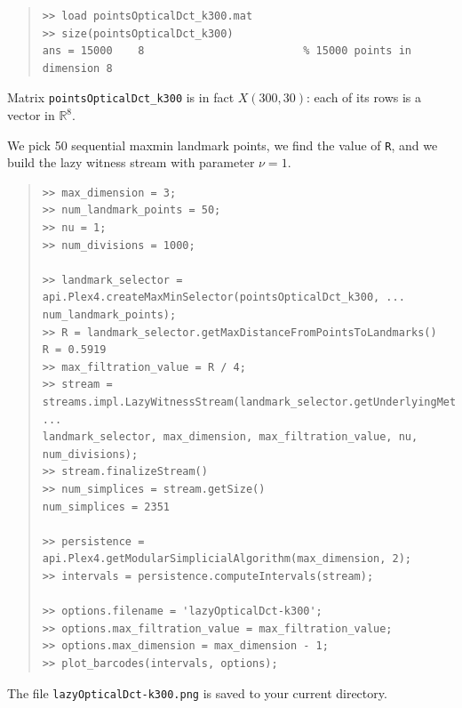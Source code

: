 \documentclass[amscd, amssymb, verbatim]{amsart}[12pt]
\theoremstyle{remark}
\theoremstyle{remark}
\theoremstyle{remark}
\newcommand{\R}{\mathbb{R}}
\begin{document}
\begin{quote} \begin{verbatim}
>> load pointsOpticalDct_k300.mat
>> size(pointsOpticalDct_k300) 
ans = 15000    8                         % 15000 points in dimension 8
\end{verbatim} \end{quote}

Matrix \texttt{pointsOpticalDct\_k300} is in fact $X(300,30)$: each of its rows is a vector in $\R^8$.

We pick 50 sequential maxmin landmark points, we find the value of \texttt{R}, and we build the lazy witness stream with parameter $\nu = 1$. 

\begin{quote} \begin{verbatim}
>> max_dimension = 3;
>> num_landmark_points = 50;
>> nu = 1;
>> num_divisions = 1000;

>> landmark_selector = api.Plex4.createMaxMinSelector(pointsOpticalDct_k300, ...
num_landmark_points);
>> R = landmark_selector.getMaxDistanceFromPointsToLandmarks() 
R = 0.5919                         
>> max_filtration_value = R / 4;
>> stream = streams.impl.LazyWitnessStream(landmark_selector.getUnderlyingMetricSpace(), ...
landmark_selector, max_dimension, max_filtration_value, nu, num_divisions);
>> stream.finalizeStream()
>> num_simplices = stream.getSize()
num_simplices = 2351                         

>> persistence = api.Plex4.getModularSimplicialAlgorithm(max_dimension, 2);
>> intervals = persistence.computeIntervals(stream);

>> options.filename = 'lazyOpticalDct-k300';
>> options.max_filtration_value = max_filtration_value;
>> options.max_dimension = max_dimension - 1;
>> plot_barcodes(intervals, options);
\end{verbatim} \end{quote}

The file \texttt{lazyOpticalDct-k300.png} is saved to your current directory.
\end{document}
